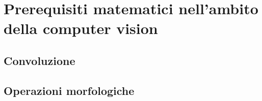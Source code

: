 \chapter{Prerequisiti matematici nell'ambito della computer vision}
\label{math-prerequisites}

\section{Convoluzione}
\section{Operazioni morfologiche}
